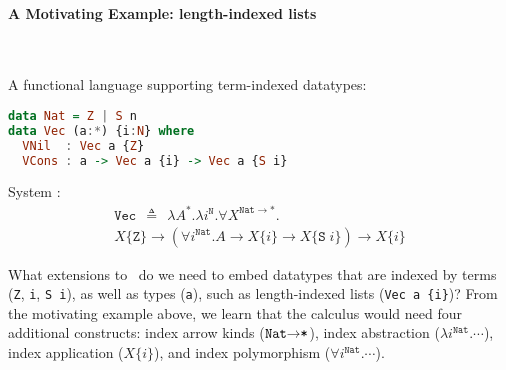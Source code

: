 \paragraph{A Motivating Example: length-indexed lists}~\vspace*{-14pt}\\
\begin{framed}\vspace*{-4pt}\noindent
\!\!\!A functional language supporting term-indexed datatypes: \vspace*{-4.5pt}
\begin{lstlisting}[basicstyle={\ttfamily},language=Haskell]
data Nat = Z | S n
data Vec (a:*) {i:N} where
  VNil  : Vec a {Z}
  VCons : a -> Vec a {i} -> Vec a {S i}
\end{lstlisting}\noindent
\!\!\!System \Fi: \vspace*{-7pt}
\begin{multline*}\!\!\!\!\!\!\!
\texttt{{Vec}}\:\:\triangleq\:\:\lambda A^{*}.\lambda i^{\texttt{{N}}}.
\forall X^{\texttt{{Nat}}\to*}.\\
X\{\texttt{{Z}}\}\to
(\forall i^{\texttt{{Nat}}}.A\to X\{i\}\to X\{\texttt{{S}}\; i\})\to X\{i\}
\!\!\!\!\!\!\!\!\!
\end{multline*}\vspace*{-20pt}
\end{framed}\vspace*{-5pt}\noindent
What extensions to \Fw\ do we need to embed datatypes that are indexed by
terms (\texttt{Z}, \texttt{i}, \texttt{S i}), as well as types (\texttt{a}),
such as length-indexed lists (\verb|Vec a {i}|)? From the motivating example
above, we learn that the calculus would need four additional constructs:
index arrow kinds ($\texttt{{Nat}\ensuremath{\to}*}$),
index abstraction ($\lambda i^{\texttt{{Nat}}}.\cdots$),
index application ($X\{i\}$), and
index polymorphism ($\forall i^{\texttt{{Nat}}}.\cdots$).


